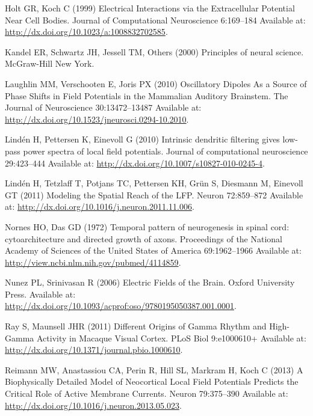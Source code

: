 \documentclass[]{article}
\begin{document}
Holt GR, Koch C (1999) Electrical Interactions via the Extracellular
Potential Near Cell Bodies. Journal of Computational Neuroscience
6:169--184 Available at:
\url{http://dx.doi.org/10.1023/a:1008832702585}.

Kandel ER, Schwartz JH, Jessell TM, Others (2000) Principles of neural
science. McGraw-Hill New York.

Laughlin MM, Verschooten E, Joris PX (2010) Oscillatory Dipoles As a
Source of Phase Shifts in Field Potentials in the Mammalian Auditory
Brainstem. The Journal of Neuroscience 30:13472--13487 Available at:
\url{http://dx.doi.org/10.1523/jneurosci.0294-10.2010}.

Lindén H, Pettersen K, Einevoll G (2010) Intrinsic dendritic filtering
gives low-pass power spectra of local field potentials. Journal of
computational neuroscience 29:423--444 Available at:
\url{http://dx.doi.org/10.1007/s10827-010-0245-4}.

Lindén H, Tetzlaff T, Potjans TC, Pettersen KH, Grün S, Diesmann M,
Einevoll GT (2011) Modeling the Spatial Reach of the LFP. Neuron
72:859--872 Available at:
\url{http://dx.doi.org/10.1016/j.neuron.2011.11.006}.

Nornes HO, Das GD (1972) Temporal pattern of neurogenesis in spinal
cord: cytoarchitecture and directed growth of axons. Proceedings of the
National Academy of Sciences of the United States of America
69:1962--1966 Available at:
\url{http://view.ncbi.nlm.nih.gov/pubmed/4114859}.

Nunez PL, Srinivasan R (2006) Electric Fields of the Brain. Oxford
University Press. Available at:
\url{http://dx.doi.org/10.1093/acprof:oso/9780195050387.001.0001}.

Ray S, Maunsell JHR (2011) Different Origins of Gamma Rhythm and
High-Gamma Activity in Macaque Visual Cortex. PLoS Biol 9:e1000610+
Available at: \url{http://dx.doi.org/10.1371/journal.pbio.1000610}.

Reimann MW, Anastassiou CA, Perin R, Hill SL, Markram H, Koch C (2013) A
Biophysically Detailed Model of Neocortical Local Field Potentials
Predicts the Critical Role of Active Membrane Currents. Neuron
79:375--390 Available at:
\url{http://dx.doi.org/10.1016/j.neuron.2013.05.023}.
\end{document}

